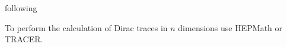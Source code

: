 following \cite{QFT}


To perform the calculation of Dirac traces in $n$ dimensions use HEPMath\cite{wiebusch_hepmath_2015} or TRACER\cite{Tracer}.
